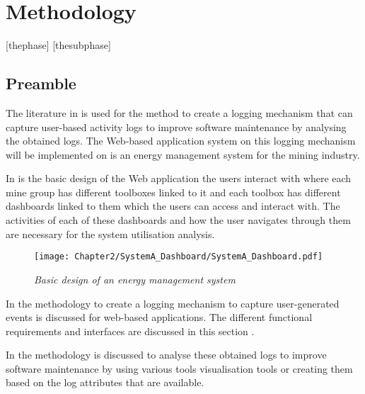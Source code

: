 \chapter{Methodology}
\label{chap:2}

 \setcounter{thephase}{0}
[thephase] \setcounter{thesubphase}{0}
[thesubphase] \setcounter{thesubsubphase}{0}
\newcommand{\phase}[1]{\refstepcounter{thephase}\textbf{F/R \arabic{thephase}}}
\newcommand{\subphase}[1]{\refstepcounter{thesubphase}\textbf{F/R \arabic{thephase}.\arabic{thesubphase}}%
	}
\newcommand{\subsubphase}[1]{\refstepcounter{thesubsubphase}\textbf{F/R \arabic{thesubphase}.\arabic{thesubsubphase}}%
}

\section{Preamble} The literature in  is used for the method to create a logging mechanism that can capture user-based activity logs to improve software maintenance by analysing the obtained logs. The Web-based application system on this logging mechanism will be implemented on is an energy management system for the mining industry.\par In  is the basic design of the Web application the users interact with where each mine group has different toolboxes linked to it and each toolbox has different dashboards linked to them which the users can access and interact with. The activities of each of these dashboards and how the user navigates through them are necessary for the system utilisation analysis.

\begin{figure}[!htb] %
	\centering %
	\texttt{[image: Chapter2/SystemA\_Dashboard/SystemA\_Dashboard.pdf]}
	\caption[Basic design of an energy management system]
	{\textit{Basic design of an energy management system}}\label{fig:ch2_webSystemBasic}
\end{figure}

In  the methodology to create a logging mechanism to capture user-generated events is discussed for web-based applications. The different functional requirements and interfaces are discussed in this section \cite{Anish2015}.\par In  the methodology is discussed to analyse these obtained logs to improve software maintenance by using various tools visualisation tools or creating them based on the log attributes that are available.

